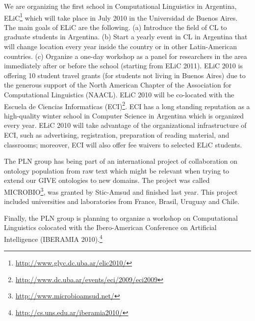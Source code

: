 We are organizing the first school in Computational Linguistics in
Argentina, ELiC\footnote{\url{http://www.glyc.dc.uba.ar/elic2010/}} which will
take place in July 2010 in the Universidad de Buenos Aires. The main goals of
ELiC are the following. (a) Introduce the field of CL to graduate students in
Argentina. (b) Start a yearly event in CL in Argentina that will change
location every year inside the country or in other Latin-American countries.
(c) Organize a one-day workshop as a panel for researchers in the area
immediately after or before the school (starting from ELiC 2011). ELiC 2010 is
offering 10 student travel grants (for students not living in Buenos Aires)
due to the generous support of the North American Chapter of the Association for
Computational Linguistics (NAACL). ELiC 2010 will be co-located with the Escuela
de Ciencias Informaticas
(ECI)\footnote{\url{http://www.dc.uba.ar/events/eci/2009/eci2009}}. ECI has a
long standing reputation as a high-quality winter school in Computer Science in
Argentina which is organized every year. ELiC 2010 will take advantage of the
organizational infrastructure of ECI, such as advertising, registration,
preparation of reading material, and classrooms; moreover, ECI will also offer
fee waivers to selected ELiC students.

The PLN group has being part of an international project of collaboration on
ontology population from raw text which might be relevant when trying to extend
our GIVE ontologies to new domains. The project was called 
MICROBIO\footnote{\url{http://www.microbioamsud.net/}}, was granted by
Stic-Amsud and finished last year. This project included universities and
laboratories from France, Brasil, Uruguay and Chile. 

Finally, the PLN group is planning to organize a workshop on Computational
Linguistics colocated with the Ibero-American Conference on Artificial
Intelligence (IBERAMIA
2010).\footnote{\url{http://cs.uns.edu.ar/iberamia2010/}} 
